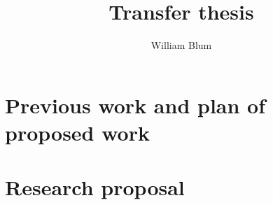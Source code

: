 \documentclass[nocenter,sfbold]{thesis}
\author{William Blum}
\title{Transfer thesis}
\begin{document}
\maketitle \tableofcontents

\part{Previous work and plan of proposed work}




\part{Research proposal}













         {\protect{}}
\end{document}
